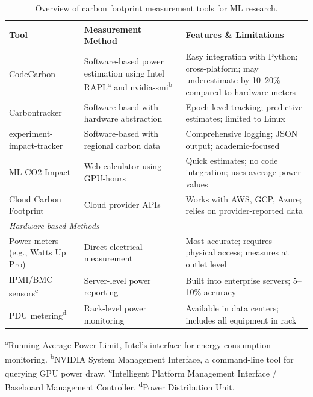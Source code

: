 \documentclass{article}
\theoremstyle{plain}
\theoremstyle{definition}
\theoremstyle{remark}
\begin{document}
\begin{table}[!ht]
\caption{Overview of carbon footprint measurement tools for ML research.}
\label{tab:tools}
\begin{center}
\begin{tabular}{p{3cm}p{4cm}p{7cm}}
\toprule
\textbf{Tool} & \textbf{Measurement Method} & \textbf{Features \& Limitations} \\
\midrule
CodeCarbon & Software-based power estimation using Intel RAPL\textsuperscript{a} and nvidia-smi\textsuperscript{b} & Easy integration with Python; cross-platform; may underestimate by 10--20\% compared to hardware meters \\
Carbontracker & Software-based with hardware abstraction & Epoch-level tracking; predictive estimates; limited to Linux \\
experiment-impact-tracker & Software-based with regional carbon data & Comprehensive logging; JSON output; academic-focused \\
ML CO2 Impact & Web calculator using GPU-hours & Quick estimates; no code integration; uses average power values \\
Cloud Carbon Footprint & Cloud provider APIs & Works with AWS, GCP, Azure; relies on provider-reported data \\
\midrule
\multicolumn{3}{l}{\textit{Hardware-based Methods}} \\
Power meters (e.g., Watts Up Pro) & Direct electrical measurement & Most accurate; requires physical access; measures at outlet level \\
IPMI/BMC sensors\textsuperscript{c} & Server-level power reporting & Built into enterprise servers; 5--10\% accuracy \\
PDU metering\textsuperscript{d} & Rack-level power monitoring & Available in data centers; includes all equipment in rack \\
\bottomrule
\end{tabular}
\end{center}
\vspace{0.5em}
\small{\textsuperscript{a}Running Average Power Limit, Intel's interface for energy consumption monitoring. \textsuperscript{b}NVIDIA System Management Interface, a command-line tool for querying GPU power draw. \textsuperscript{c}Intelligent Platform Management Interface / Baseboard Management Controller. \textsuperscript{d}Power Distribution Unit.}
\end{table}
\end{document}
